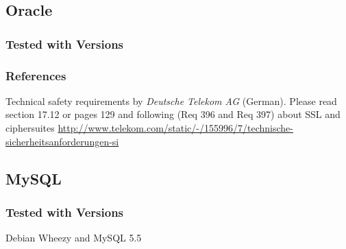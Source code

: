 
\subsection{Oracle}
\subsubsection{Tested with Versions}


\subsubsection{References}
\begin{itemize*}
  \item Technical safety requirements by \emph{Deutsche Telekom AG} (German). Please read section 17.12 or pages 129 and following (Req 396 and Req 397) about SSL and ciphersuites \url{http://www.telekom.com/static/-/155996/7/technische-sicherheitsanforderungen-si}
\end{itemize*}






\subsection{MySQL}


\subsubsection{Tested with Versions}
\begin{itemize*}
  \item Debian Wheezy and MySQL 5.5
\end{itemize*}



